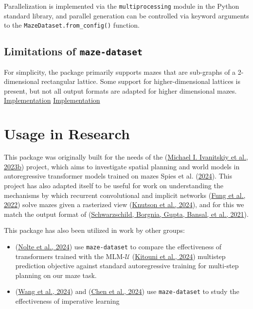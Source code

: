 \documentclass[10pt,a4paper,onecolumn]{article}
\begin{document}
Parallelization is implemented via the \texttt{multiprocessing} module
in the Python standard library, and parallel generation can be
controlled via keyword arguments to the
\texttt{MazeDataset.from\_config()} function.

\hypertarget{limitations}{%
\subsection{\texorpdfstring{Limitations of
\texttt{maze-dataset}}{Limitations of maze-dataset}}\label{limitations}}

For simplicity, the package primarily supports mazes that are sub-graphs
of a 2-dimensional rectangular lattice. Some support for
higher-dimensional lattices is present, but not all output formats are
adapted for higher dimensional mazes.
\protect\hyperlink{implementation-implementation}{Implementation}
\protect\hyperlink{implementation-implementation}{Implementation}

\hypertarget{usage-in-research}{%
\section{Usage in Research}\label{usage-in-research}}

This package was originally built for the needs of the
(\protect\hyperlink{ref-maze-transformer-github}{Michael I. Ivanitskiy
et al., 2023b}) project, which aims to investigate spatial planning and
world models in autoregressive transformer models trained on mazes Spies
et al. (\protect\hyperlink{ref-spies2024causalworldmodels}{2024}). This
project has also adapted itself to be useful for work on understanding
the mechanisms by which recurrent convolutional and implicit networks
(\protect\hyperlink{ref-fung2022jfb}{Fung et al., 2022}) solve mazes
given a rasterized view
(\protect\hyperlink{ref-knutson2024logicalextrapolation}{Knutson et al.,
2024}), and for this we match the output format of
(\protect\hyperlink{ref-easy_to_hard}{Schwarzschild, Borgnia, Gupta,
Bansal, et al., 2021}).

This package has also been utilized in work by other groups:

\begin{itemize}
\item
  (\protect\hyperlink{ref-nolte2024multistep}{Nolte et al., 2024}) use
  \texttt{maze-dataset} to compare the effectiveness of transformers
  trained with the MLM-\(\mathcal{U}\)
  (\protect\hyperlink{ref-MLMU-kitouni2024factorization}{Kitouni et al.,
  2024}) multistep prediction objective against standard autoregressive
  training for multi-step planning on our maze task.
\item
  (\protect\hyperlink{ref-wang2024imperative}{Wang et al., 2024}) and
  (\protect\hyperlink{ref-chen2024iaimperative}{Chen et al., 2024}) use
  \texttt{maze-dataset} to study the effectiveness of imperative
  learning
\end{itemize}
\end{document}
